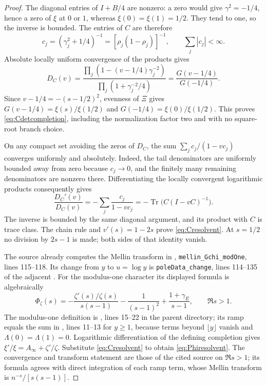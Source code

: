 \documentclass[11pt,a4paper]{article}
\newcommand{\Tr}{\operatorname{Tr}}
\begin{document}
\begin{proof}
The diagonal entries of $I+B/4$ are nonzero: a zero would give $\gamma^2=-1/4$, hence a zero of $\xi$ at $0$ or $1$, whereas $\xi(0)=\xi(1)=1/2$. They tend to one, so the inverse is bounded. The entries of $C$ are therefore
\[
 c_j=(\gamma_j^2+1/4)^{-1}=[\rho_j(1-\rho_j)]^{-1},
 \qquad \sum_j|c_j|<\infty.
\]
Absolute locally uniform convergence of the products gives
\[
 D_C(v)=\frac{\prod_j(1-(v-1/4)\gamma_j^{-2})}
 {\prod_j(1+\gamma_j^{-2}/4)}
 =\frac{G(v-1/4)}{G(-1/4)}.
\]
Since $v-1/4=-(s-1/2)^2$, evenness of $\Xi$ gives
$G(v-1/4)=\xi(s)/\xi(1/2)$ and
$G(-1/4)=\xi(0)/\xi(1/2)$. This proves \eqref{eq:Cdetcompletion}, including the normalization factor two and with no square-root branch choice.

On any compact set avoiding the zeros of $D_C$, the sum
$\sum_j c_j/(1-vc_j)$ converges uniformly and absolutely. Indeed, the tail denominators are uniformly bounded away from zero because $c_j\to0$, and the finitely many remaining denominators are nonzero there. Differentiating the locally convergent logarithmic products consequently gives
\[
 \frac{D_C'(v)}{D_C(v)}=-\sum_j\frac{c_j}{1-vc_j}
 =-\Tr\bigl(C(I-vC)^{-1}\bigr).
\]
The inverse is bounded by the same diagonal argument, and its product with $C$ is trace class. The chain rule and $v'(s)=1-2s$ prove \eqref{eq:Cresolvent}. At $s=1/2$ no division by $2s-1$ is made; both sides of that identity vanish.

The source already computes the Mellin transform in
,
\texttt{mellin\_Gchi\_modOne}, lines 115--118. Its change from $y$ to $u=\log y$ is
\texttt{poleData\_change}, lines 114--135 of the adjacent .
For the modulus-one character its displayed formula is algebraically
\[
 \Phi_\zeta(s)=-\frac{\zeta'(s)/\zeta(s)}{s(s-1)}
 -\frac1{(s-1)^2}+\frac{1+\gamma_E}{s-1},\qquad \Re s>1.
\]
The modulus-one definition is , lines 15--22 in the parent directory; its ramp equals the sum in , lines 11--13 for $y\ge1$, because terms beyond $\lfloor y\rfloor$ vanish and $\Lambda(0)=\Lambda(1)=0$.
Logarithmic differentiation of the defining completion gives
$\xi'/\xi=A_\infty+\zeta'/\zeta$. Substitute \eqref{eq:Cresolvent} to obtain \eqref{eq:Phiresolvent}. The convergence and transform statement are those of the cited source on $\Re s>1$; its formula agrees with direct integration of each ramp term, whose Mellin transform is $n^{-s}/[s(s-1)]$.
\end{proof}
\end{document}
